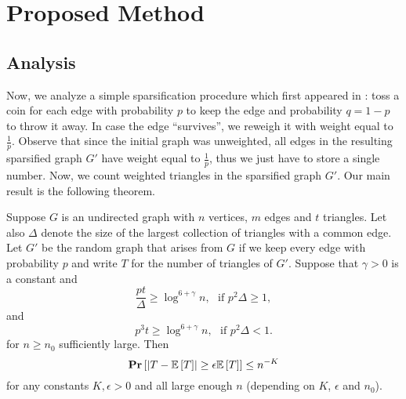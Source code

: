 \documentclass{llncs}
\newcommand{\beql}[1]{\begin{equation}\label{#1}}
\newcommand{\eeq}{\end{equation}}
\newcommand{\Abs}[1]{{\left|{#1}\right|}}
\newcommand{\Mean}[1]{{\mathbb E}\left[{#1}\right]}
\newcommand{\Prob}[1]{{{\bf{Pr}}\left[{#1}\right]}}
\begin{document}
\section{Proposed Method}
\label{sec:method}

\subsection{Analysis}

Now, we analyze a simple sparsification procedure which first appeared in \cite{Tsourakakiskdd09}:
toss a coin for each edge with probability $p$ to keep the edge and probability $q=1-p$
to throw it away. In case the edge ``survives'', we reweigh it with weight equal to $\frac{1}{p}$.
Observe that since the initial graph was unweighted, all edges in the resulting sparsified graph $G'$ have
weight equal to $\frac{1}{p}$, thus we just have to store a single number. Now, we count weighted triangles
in the sparsified graph $G'$. Our main result is the following theorem.


\begin{theorem}
\label{thrm:kolount}
Suppose $G$ is an undirected graph with $n$ vertices, $m$ edges and $t$ triangles. Let also $\Delta$ denote the size of the largest collection of triangles with a common edge. Let $G'$ be the random graph that arises from $G$ if we keep every edge with probability $p$ and write $T$ for the number of triangles of $G'$. Suppose that $\gamma>0$ is a constant and 
\beql{cond}
\frac{pt}{\Delta} \ge \log^{6+\gamma} n, \ \ \ \mbox{if $p^2\Delta \ge 1$},
\eeq
and
\beql{cond-small}
p^3 t \ge \log^{6+\gamma} n, \ \ \ \mbox{if $p^2\Delta < 1$}.
\eeq
for $n \ge n_0$ sufficiently large.
Then
$$
\Prob{\Abs{T-\Mean{T}} \ge \epsilon \Mean{T}} \le n^{-K}
$$
for any constants $K, \epsilon > 0$ and all large enough $n$ (depending on $K$, $\epsilon$ and $n_0$).
\end{theorem}
\end{document}
